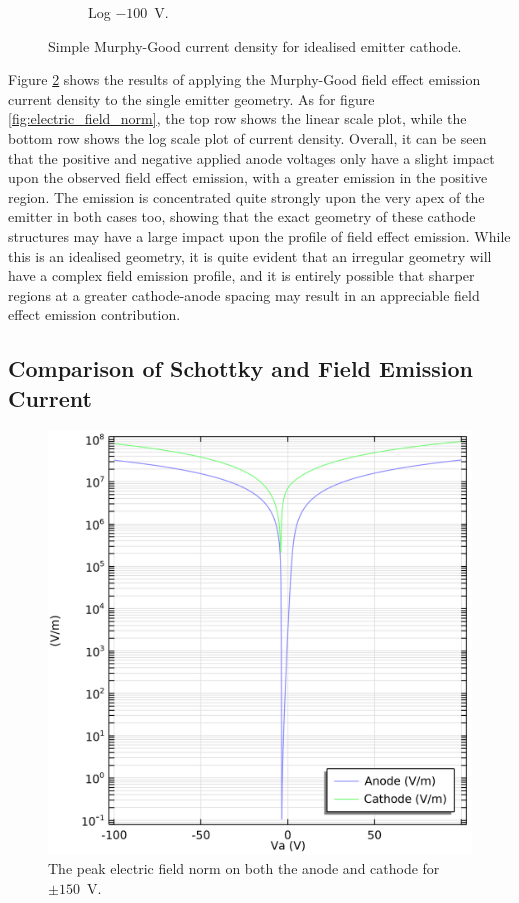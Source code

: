 \begin{refsection}
\begin{figure}[H]
\begin{subfigure}[b]{0.45\linewidth}
        \caption{Log $-100$~\si{\volt}.}
        \label{fig:c_-100_log_j_gm}
    \end{subfigure}
    
    \caption{Simple Murphy-Good current density for idealised emitter cathode.}
    \label{fig:field_emission}
\end{figure}

Figure \ref{fig:field_emission} shows the results of applying the Murphy-Good field effect emission current density to the single emitter geometry. As for figure \ref{fig:electric_field_norm}, the top row shows the linear scale plot, while the bottom row shows the log scale plot of current density. Overall, it can be seen that the positive and negative applied anode voltages only have a slight impact upon the observed field effect emission, with a greater emission in the positive region. The emission is concentrated quite strongly upon the very apex of the emitter in both cases too, showing that the exact geometry of these cathode structures may have a large impact upon the profile of field effect emission. While this is an idealised geometry, it is quite evident that an irregular geometry will have a complex field emission profile, and it is entirely possible that sharper regions at a greater cathode-anode spacing may result in an appreciable field effect emission contribution. 

\subsection{Comparison of Schottky and Field Emission Current}
\begin{figure}
    \centering
    \includegraphics[width=\linewidth]{Chapter7/Figs/Raster/Comsol/cathode_anode_comparison.png}
    \caption{The peak electric field norm on both the anode and cathode for $\pm150$~\si{\volt}.}
    \label{fig:c_cathode_anode_comparison}
\end{figure}


\end{refsection}
